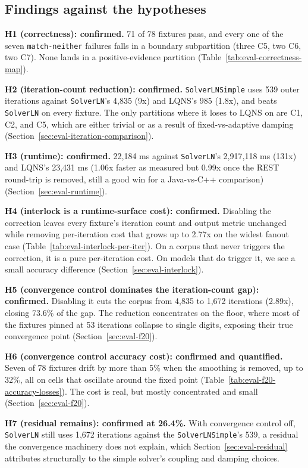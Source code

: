 \subsection{Findings against the hypotheses}

\textbf{H1 (correctness): confirmed.} 71 of 78 fixtures pass, and every one of the seven \texttt{match-neither} failures falls in a boundary subpartition (three C5, two C6, two C7). None lands in a positive-evidence partition (Table~\ref{tab:eval-correctness-map}). 

\textbf{H2 (iteration-count reduction): confirmed.} \texttt{SolverLNSimple} uses 539 outer iterations against \texttt{SolverLN}'s 4,835 (9x) and LQNS's 985 (1.8x), and beats \texttt{SolverLN} on every fixture. The only partitions where it loses to LQNS on are C1, C2, and C5, which are either trivial or as a result of fixed-vs-adaptive damping (Section~\ref{sec:eval-iteration-comparison}).

\textbf{H3 (runtime): confirmed.} 22,184 ms against \texttt{SolverLN}'s 2,917,118 ms (131x) and LQNS's 23,431 ms (1.06x faster as measured but 0.99x once the REST round-trip is removed, still a good win for a Java-vs-C++ comparison) (Section~\ref{sec:eval-runtime}).

\textbf{H4 (interlock is a runtime-surface cost): confirmed.} Disabling the correction leaves every fixture's iteration count and output metric unchanged while removing per-iteration cost that grows up to 2.77x on the widest fanout case (Table~\ref{tab:eval-interlock-per-iter}). On a corpus that never triggers the correction, it is a pure per-iteration cost. On models that do trigger it, we see a small accuracy difference (Section~\ref{sec:eval-interlock}).

\textbf{H5 (convergence control dominates the iteration-count gap): confirmed.} Disabling it cuts the corpus from 4,835 to 1,672 iterations (2.89x), closing 73.6\% of the gap. The reduction concentrates on the floor, where most of the fixtures pinned at 53 iterations collapse to single digits, exposing their true convergence point (Section~\ref{sec:eval-f20}).

\textbf{H6 (convergence control accuracy cost): confirmed and quantified.} Seven of 78 fixtures drift by more than 5\% when the smoothing is removed, up to 32\%, all on cells that oscillate around the fixed point (Table~\ref{tab:eval-f20-accuracy-losses}). The cost is real, but mostly concentrated and small (Section~\ref{sec:eval-f20}).

\textbf{H7 (residual remains): confirmed at 26.4\%.} With convergence control off, \texttt{SolverLN} still uses 1,672 iterations against the \texttt{SolverLNSimple}'s 539, a residual the convergence machinery does not explain, which Section~\ref{sec:eval-residual} attributes structurally to the simple solver's coupling and damping choices.




